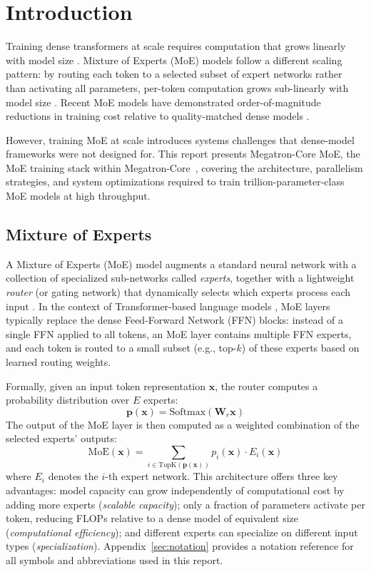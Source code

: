 \section{Introduction}

Training dense transformers at scale requires computation that grows linearly with model size \cite{kaplan2020scaling,hoffmann2022chinchilla}. Mixture of Experts (MoE) models follow a different scaling pattern: by routing each token to a selected subset of expert networks rather than activating all parameters, per-token computation grows sub-linearly with model size \cite{shazeer2017,fedus2022switchtransformersscalingtrillion}. Recent MoE models have demonstrated order-of-magnitude reductions in training cost relative to quality-matched dense models \cite{jiang2024mixtralexperts,deepseekai2025deepseekv3technicalreport,Cai_2025}.

However, training MoE at scale introduces systems challenges that dense-model frameworks were not designed for. This report presents Megatron-Core MoE, the MoE training stack within Megatron-Core~\cite{shoeybi2020megatronlmtrainingmultibillionparameter}, covering the architecture, parallelism strategies, and system optimizations required to train trillion-parameter-class MoE models at high throughput.

\subsection{Mixture of Experts}

A Mixture of Experts (MoE) model augments a standard neural network with a collection of specialized sub-networks called \emph{experts}, together with a lightweight \emph{router} (or gating network) that dynamically selects which experts process each input \cite{shazeer2017,jacobs1991adaptive,eigen2013learning}. In the context of Transformer-based language models \cite{vaswani2017attention}, MoE layers typically replace the dense Feed-Forward Network (FFN) blocks: instead of a single FFN applied to all tokens, an MoE layer contains multiple FFN experts, and each token is routed to a small subset (e.g., top-$k$) of these experts based on learned routing weights.

Formally, given an input token representation $\mathbf{x}$, the router computes a probability distribution over $E$ experts:
\[
\mathbf{p}(\mathbf{x}) = \text{Softmax}(\mathbf{W}_r \mathbf{x})
\]
The output of the MoE layer is then computed as a weighted combination of the selected experts' outputs:
\[
\text{MoE}(\mathbf{x}) = \sum_{i \in \text{TopK}(\mathbf{p}(\mathbf{x}))} p_i(\mathbf{x}) \cdot E_i(\mathbf{x})
\]
where $E_i$ denotes the $i$-th expert network. This architecture offers three key advantages: model capacity can grow independently of computational cost by adding more experts (\emph{scalable capacity}); only a fraction of parameters activate per token, reducing FLOPs relative to a dense model of equivalent size (\emph{computational efficiency}); and different experts can specialize on different input types (\emph{specialization}). Appendix~\ref{sec:notation} provides a notation reference for all symbols and abbreviations used in this report.

